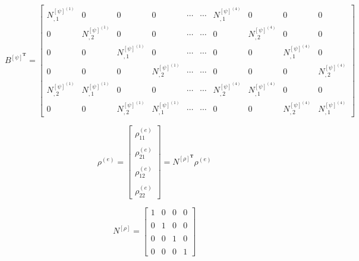 \documentclass{article}
\begin{document}
\[
B^{[\psi]^\textbf{T}}=
\begin{bmatrix}
N_{,1}^{{[\psi]}^{(1)}}&0&0&0&\cdots&\cdots&N_{,1}^{{[\psi]}^{(4)}}&0&0&0 \\
0&N_{,2}^{{[\psi]}^{(1)}}&0&0&\cdots&\cdots&0&N_{,2}^{{[\psi]}^{(4)}}&0&0 \\
0&0&N_{,1}^{{[\psi]}^{(1)}}&0&\cdots&\cdots&0&0&N_{,1}^{{[\psi]}^{(4)}}&0 \\
0&0&0&N_{,2}^{{[\psi]}^{(1)}}&\cdots&\cdots&0&0&0&N_{,2}^{{[\psi]}^{(4)}} \\
N_{,2}^{{[\psi]}^{(1)}}&N_{,1}^{{[\psi]}^{(1)}}&0&0&\cdots&\cdots&N_{,2}^{{[\psi]}^{(4)}}&N_{,1}^{{[\psi]}^{(4)}}&0&0 \\
0&0&N_{,2}^{{[\psi]}^{(1)}}&N_{,1}^{{[\psi]}^{(1)}}&\cdots&\cdots&0&0&N_{,2}^{{[\psi]}^{(4)}}&N_{,1}^{{[\psi]}^{(4)}} 
\end{bmatrix}
\]


\[
\rho^{(e)}=
\begin{bmatrix}
\rho_{11}^{(e)} \\
\\
\rho_{21}^{(e)} \\
\\
\rho_{12}^{(e)} \\
\\
\rho_{22}^{(e)}
\end{bmatrix}
=N^{[\rho]^{\textbf{T}}}\rho^{(e)}
\]

\[
N^{[\rho]}=
\begin{bmatrix}
1&0&0&0 \\
\\
0&1&0&0 \\
\\
0&0&1&0 \\
\\
0&0&0&1
\end{bmatrix}
\]
\end{document}
